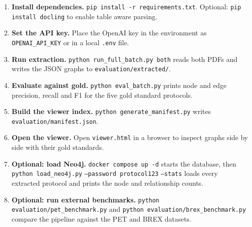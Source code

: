 \documentclass{article}
\begin{document}
\begin{enumerate}[leftmargin=2em]
    \item \textbf{Install dependencies.}
    \texttt{pip install -r requirements.txt}.
    Optional: \texttt{pip install docling} to enable table aware
    parsing.
    \item \textbf{Set the API key.}
    Place the OpenAI key in the environment as
    \texttt{OPENAI\_API\_KEY} or in a local \texttt{.env} file.
    \item \textbf{Run extraction.}
    \texttt{python run\_full\_batch.py both} reads both PDFs and
    writes the JSON graphs to \texttt{evaluation/extracted/}.
    \item \textbf{Evaluate against gold.}
    \texttt{python eval\_batch.py} prints node and edge precision,
    recall and F1 for the five gold standard protocols.
    \item \textbf{Build the viewer index.}
    \texttt{python generate\_manifest.py} writes
    \texttt{evaluation/manifest.json}.
    \item \textbf{Open the viewer.}
    Open \texttt{viewer.html} in a browser to inspect graphs side by
    side with their gold standards.
    \item \textbf{Optional: load Neo4j.}
    \texttt{docker compose up -d} starts the database, then
    \texttt{python load\_neo4j.py}\allowbreak{}
    \texttt{--password protocol123}\allowbreak{}
    \texttt{--stats} loads every extracted protocol and prints the
    node and relationship counts.
    \item \textbf{Optional: run external benchmarks.}
    \texttt{python evaluation/pet\_benchmark.py}\allowbreak{} and
    \texttt{python evaluation/brex\_benchmark.py}\allowbreak{}
    compare the pipeline against the PET and BREX datasets.
\end{enumerate}

\end{document}
